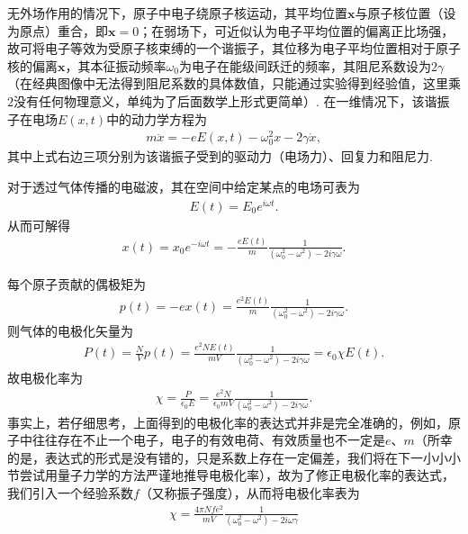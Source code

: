 \documentclass[a4paper, 10pt]{article}
\begin{document}
\begin{multicols}{2}
无外场作用的情况下，原子中电子绕原子核运动，其平均位置$\bm{x}$与原子核位置（设为原点）重合，即$\bm{x}=0$；在弱场下，可近似认为电子平均位置的偏离正比场强，故可将电子等效为受原子核束缚的一个谐振子，其位移为电子平均位置相对于原子核的偏离$\bm{x}$，其本征振动频率$\omega_0$为电子在能级间跃迁的频率，其阻尼系数设为$2\gamma$（在经典图像中无法得到阻尼系数的具体数值，只能通过实验得到经验值，这里乘$2$没有任何物理意义，单纯为了后面数学上形式更简单）. 在一维情况下，该谐振子在电场$E(x,t)$中的动力学方程为
\begin{align}
    \label{motion-equ}
    m\ddot{x}=-eE(x,t)-\omega_0^2x-2\gamma\dot{x},
\end{align}
其中上式右边三项分别为该谐振子受到的驱动力（电场力）、回复力和阻尼力.

对于透过气体传播的电磁波，其在空间中给定某点的电场可表为
\begin{align}
    E(t)=E_0e^{i\omega t}.
\end{align}
从而可解得
\begin{align}
    x(t)=x_0e^{-i\omega t}=-\frac{eE(t)}{m}\frac{1}{(\omega_0^2-\omega^2)-2i\gamma\omega}.
\end{align}

每个原子贡献的偶极矩为
\begin{align}
    p(t)=-ex(t)=\frac{e^2E(t)}{m}\frac{1}{(\omega_0^2-\omega^2)-2i\gamma\omega}.
\end{align}
则气体的电极化矢量为
\begin{align}
    P(t)=\frac{N}{V}p(t)=\frac{e^2NE(t)}{mV}\frac{1}{(\omega_0^2-\omega^2)-2i\gamma\omega}=\epsilon_0\chi E(t).
\end{align}
故电极化率为
\begin{align}
    \chi=\frac{P}{\epsilon_0E}=\frac{e^2N}{\epsilon_0mV}\frac{1}{(\omega_0^2-\omega^2)-2i\gamma\omega}.
\end{align}
事实上，若仔细思考，上面得到的电极化率的表达式并非是完全准确的，例如，原子中往往存在不止一个电子，电子的有效电荷、有效质量也不一定是$e$、$m$（所幸的是，表达式的形式是没有错的，只是系数上存在一定偏差，我们将在下一小小小节尝试用量子力学的方法严谨地推导电极化率），故为了修正电极化率的表达式，我们引入一个经验系数$f$（又称振子强度），从而将电极化率表为
\begin{align}
    \chi=\frac{4\pi Nfe^2}{mV}\frac{1}{(\omega_0^2-\omega^2)-2i\omega\gamma}
\end{align}


\end{multicols}
\end{document}

